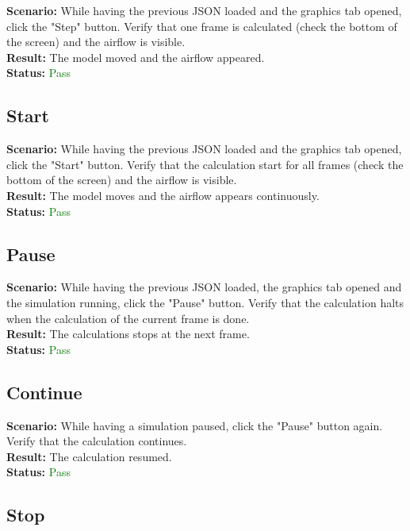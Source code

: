 \documentclass[a4paper, 11pt, article]{report}
\begin{document}
\noindent \textbf{Scenario:} While having the previous JSON loaded and the graphics tab opened, click the "Step" button. Verify that one frame is calculated (check the bottom of the screen) and the airflow is visible.
\\
\noindent \textbf{Result:} The model moved and the airflow appeared.
\\
\noindent \textbf{Status:} \textcolor{green}{Pass}

\subsection{Start}

\noindent \textbf{Scenario:} While having the previous JSON loaded and the graphics tab opened, click the "Start" button. Verify that the calculation start for all frames (check the bottom of the screen) and the airflow is visible.
\\
\noindent \textbf{Result:} The model moves and the airflow appears continuously.
\\
\noindent \textbf{Status:} \textcolor{green}{Pass}

\subsection{Pause}

\noindent \textbf{Scenario:} While having the previous JSON loaded, the graphics tab opened and the simulation running, click the "Pause" button. Verify that the calculation halts when the calculation of the current frame is done.
\\
\noindent \textbf{Result:} The calculations stops at the next frame.
\\
\noindent \textbf{Status:} \textcolor{green}{Pass}

\subsection{Continue}

\noindent \textbf{Scenario:} While having a simulation paused, click the "Pause" button again. Verify that the calculation continues.
\\
\noindent \textbf{Result:} The calculation resumed.
\\
\noindent \textbf{Status:} \textcolor{green}{Pass}

\subsection{Stop}
\end{document}
